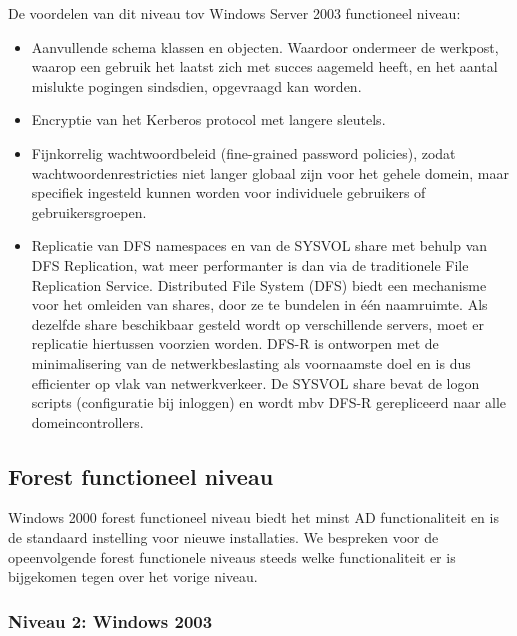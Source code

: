 De voordelen van dit niveau tov Windows Server 2003 functioneel niveau:
\begin{itemize}
	\item Aanvullende schema klassen en objecten. Waardoor ondermeer de
		werkpost, waarop een gebruik het laatst zich met succes aagemeld
		heeft, en het aantal mislukte pogingen sindsdien, opgevraagd
		kan worden.
	\item Encryptie van het Kerberos protocol met langere sleutels.
	\item Fijnkorrelig wachtwoordbeleid (fine-grained password policies),
		zodat wachtwoordenrestricties niet langer globaal zijn voor het
		gehele domein, maar specifiek ingesteld kunnen worden voor
		individuele gebruikers of gebruikersgroepen.
	\item Replicatie van DFS namespaces en van de SYSVOL share met behulp
		van DFS Replication, wat meer performanter is dan via de
		traditionele File Replication Service. Distributed File System
		(DFS) biedt een mechanisme voor het omleiden van shares, door ze
		te bundelen in één naamruimte. Als dezelfde share beschikbaar
		gesteld wordt op verschillende servers, moet er replicatie
		hiertussen voorzien worden. DFS-R is ontworpen met de
		minimalisering van de netwerkbeslasting als voornaamste doel en
		is dus efficienter op vlak van netwerkverkeer.
		De SYSVOL share bevat de logon scripts (configuratie bij
		inloggen) en wordt mbv DFS-R gerepliceerd naar alle
		domeincontrollers.
\end{itemize}

\subsection{Forest functioneel niveau}

Windows 2000 forest functioneel niveau biedt het minst AD functionaliteit en is
de standaard instelling voor nieuwe installaties. We bespreken voor de
opeenvolgende forest functionele niveaus steeds welke functionaliteit er is
bijgekomen tegen over het vorige niveau.

\subsubsection{Niveau 2: Windows 2003}

